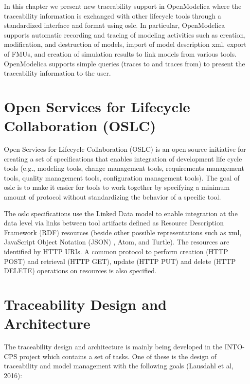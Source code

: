 In this chapter we present new traceability support in OpenModelica where the traceability information is exchanged with other lifecycle 
tools through a standardized interface and format using \acrshort{oslc}. In particular, OpenModelica supports automatic recording and tracing of
modeling activities such as creation, modification, and destruction of models, import of model description \acrshort{xml}, export of FMUs, and creation of simulation results to link models from various tools. OpenModelica supports simple queries (traces to and traces from) to present the traceability information to the user.


\section{Open Services for Lifecycle Collaboration (OSLC)}
\label{sec:tracaebilityoslc}

Open Services for Lifecycle Collaboration (OSLC) \cite{oslc} is an open source initiative
for creating a set of specifications that enables integration of development life cycle tools (e.g.,
modeling tools, change management tools, requirements management tools, quality management
tools, configuration management tools). The goal of \acrshort{oslc} is to make it easier for tools to work together by
specifying a minimum amount of protocol without standardizing the behavior of a specific tool.

The \acrshort{oslc} specifications use the Linked Data model to enable integration at the data level via links between
tool artifacts defined as Resource Description Framework (RDF) \cite{rdffrank} resources (beside other possible representations such as
\acrshort{xml}, JavaScript Object Notation (JSON) \cite{json}, Atom, and Turtle). The resources are identified
by HTTP URIs. A common protocol to perform creation (HTTP POST) and retrieval (HTTP GET), update (HTTP PUT) and delete (HTTP DELETE) operations on resources is also specified.


\section{Traceability Design and Architecture}
\label{sec:tracaebilitydesign}


The traceability design and architecture is mainly being developed in the INTO-CPS project \cite{intocpspaper,intocps} 
which contains a set of tasks. One of these is the design of traceability and model management with the following goals (Lausdahl et al, 2016):

